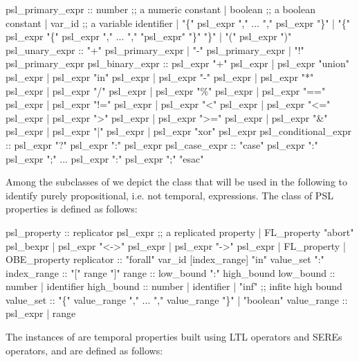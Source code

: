 \begin{Grammar}
psl_primary_expr ::
   number                                ;; a numeric constant
 | boolean                               ;; a boolean constant
 | var_id                                ;; a variable identifier
 | "\{" psl_expr "," ... "," psl_expr "\}"
 | "\{" psl_expr "\{" psl_expr "," ... "," "psl_expr" "\}" "\}"
 | "(" psl_expr ")"
psl_unary_expr ::
   "+" psl_primary_expr     
 | "-" psl_primary_expr  
 | "!" psl_primary_expr  
psl_binary_expr ::
   psl_expr "+" psl_expr    
 | psl_expr "union" psl_expr 
 | psl_expr "in" psl_expr 
 | psl_expr "-" psl_expr   
 | psl_expr "*" psl_expr   
 | psl_expr "/" psl_expr   
 | psl_expr "\%" psl_expr 
 | psl_expr "==" psl_expr    
 | psl_expr "!=" psl_expr  
 | psl_expr "<" psl_expr       
 | psl_expr "<=" psl_expr       
 | psl_expr ">" psl_expr       
 | psl_expr ">=" psl_expr       
 | psl_expr "&" psl_expr 
 | psl_expr "|" psl_expr 
 | psl_expr "xor" psl_expr 
psl_conditional_expr ::
 psl_expr "?" psl_expr ":" psl_expr 
psl_case_expr ::
 "case"
     psl_expr ":" psl_expr ";"
     ...
     psl_expr ":" psl_expr ";"
 "esac"    
\end{Grammar}
%
Among the subclasses of  we depict the class
 that will be used in the following to identify purely
propositional, i.e. not temporal, expressions. The class of PSL
properties  is defined as follows:
%
\begin{Grammar}
psl_property :: 
   replicator psl_expr                   ;; a replicated property 
 | FL_property "abort" psl_bexpr
 | psl_expr "<->" psl_expr
 | psl_expr "->" psl_expr
 | FL_property       
 | OBE_property      
replicator :: 
   "forall" var_id [index_range] "in" value_set ":" 
index_range :: 
   "[" range "]" 
range :: 
   low_bound ":" high_bound 
low_bound :: 
   number              
 | identifier         
high_bound :: 
   number 
 | identifier
 | "inf"                                 ;; infite high bound 
value_set :: 
   "\{" value_range "," ... "," value_range "\}" 
 | "boolean"
value_range :: 
   psl_expr
 | range
\end{Grammar}
%
The instances of  are temporal properties built
using LTL operators and SEREs operators, and are defined as follows:
%


